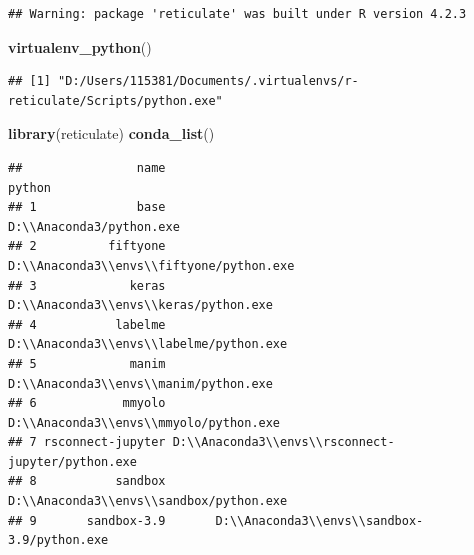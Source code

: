 \documentclass[
]{book}
\newenvironment{Shaded}{\begin{snugshade}}{\end{snugshade}}
\newcommand{\FunctionTok}[1]{\textcolor[rgb]{0.13,0.29,0.53}{\textbf{#1}}}
\newcommand{\NormalTok}[1]{#1}
\theoremstyle{definition}
\theoremstyle{definition}
\theoremstyle{definition}
\theoremstyle{definition}
\theoremstyle{remark}
\begin{document}
\begin{verbatim}
## Warning: package 'reticulate' was built under R version 4.2.3
\end{verbatim}

\begin{Shaded}
\begin{Highlighting}[]
\FunctionTok{virtualenv\_python}\NormalTok{()}
\end{Highlighting}
\end{Shaded}

\begin{verbatim}
## [1] "D:/Users/115381/Documents/.virtualenvs/r-reticulate/Scripts/python.exe"
\end{verbatim}

\begin{Shaded}
\begin{Highlighting}[]
\FunctionTok{library}\NormalTok{(reticulate)}
\FunctionTok{conda\_list}\NormalTok{()}
\end{Highlighting}
\end{Shaded}

\begin{verbatim}
##                name                                            python
## 1              base                          D:\\Anaconda3/python.exe
## 2          fiftyone          D:\\Anaconda3\\envs\\fiftyone/python.exe
## 3             keras             D:\\Anaconda3\\envs\\keras/python.exe
## 4           labelme           D:\\Anaconda3\\envs\\labelme/python.exe
## 5             manim             D:\\Anaconda3\\envs\\manim/python.exe
## 6            mmyolo            D:\\Anaconda3\\envs\\mmyolo/python.exe
## 7 rsconnect-jupyter D:\\Anaconda3\\envs\\rsconnect-jupyter/python.exe
## 8           sandbox           D:\\Anaconda3\\envs\\sandbox/python.exe
## 9       sandbox-3.9       D:\\Anaconda3\\envs\\sandbox-3.9/python.exe
\end{verbatim}
\end{document}
